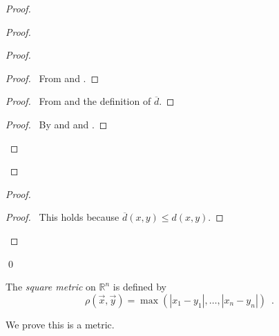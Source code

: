 \begin{proof}
  \pf
  \begin{proof}
    \begin{proof}
      \begin{proof}
        \pf\ From  and .
      \end{proof}
      \begin{proof}
        \pf\ From  and the definition of $\overline{d}$.
      \end{proof}
      \begin{proof}
        \pf\ By  and  and .
      \end{proof}
    \end{proof}
  \end{proof}
  \begin{proof}
    \begin{proof}
      \pf\ This holds because $\overline{d}(x, y) \leq d(x, y)$.
    \end{proof}
  \end{proof}
  \qed
\end{proof}

\begin{df}
  The \emph{square metric} on $\mathbb{R}^n$ is defined by
  \[ \rho(\vec{x}, \vec{y}) = \max(|x_1 - y_1|, \ldots, |x_n - y_n|) \enspace
  . \]

  We prove this is a metric.
\end{df}

